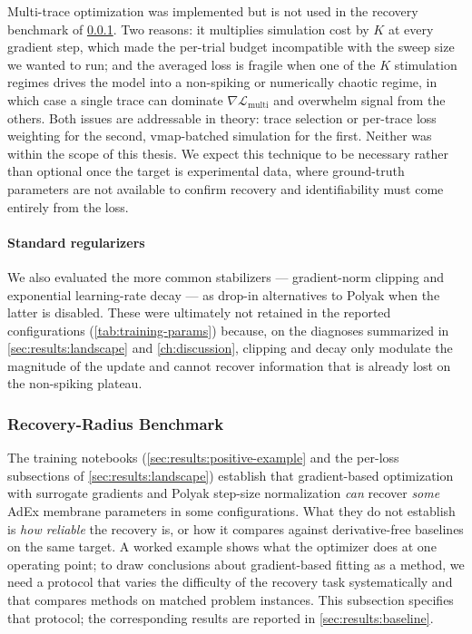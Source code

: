 Multi-trace optimization was implemented but is not used in the recovery benchmark of \cref{sec:method:opt:recovery-benchmark}.
Two reasons: it multiplies simulation cost by $K$ at every gradient step, which made the per-trial budget incompatible with the sweep size we wanted to run;
and the averaged loss is fragile when one of the $K$ stimulation regimes drives the model into a non-spiking or numerically chaotic regime,
in which case a single trace can dominate $\nabla\mathcal{L}_{\mathrm{multi}}$ and overwhelm signal from the others.
Both issues are addressable in theory: trace selection or per-trace loss weighting for the second, vmap-batched simulation for the first.
Neither was within the scope of this thesis.
We expect this technique to be necessary rather than optional once the target is experimental data,
where ground-truth parameters are not available to confirm recovery and identifiability must come entirely from the loss.

\paragraph{Standard regularizers}\label{sec:method:opt:stabilization:misc}
We also evaluated the more common stabilizers --- gradient-norm clipping and exponential learning-rate decay ---
as drop-in alternatives to Polyak when the latter is disabled.
These were ultimately not retained in the reported configurations (\cref{tab:training-params})
because, on the diagnoses summarized in \cref{sec:results:landscape} and \cref{ch:discussion},
clipping and decay only modulate the magnitude of the update and cannot recover information that is already lost on the non-spiking plateau.

\subsubsection{Recovery-Radius Benchmark}\label{sec:method:opt:recovery-benchmark}
The training notebooks (\cref{sec:results:positive-example} and the per-loss subsections of \cref{sec:results:landscape}) establish that
gradient-based optimization with surrogate gradients and Polyak step-size normalization \emph{can} recover \emph{some} \gls{AdEx} membrane parameters in some configurations.
What they do not establish is \emph{how reliable} the recovery is, or how it compares against derivative-free baselines on the same target.
A worked example shows what the optimizer does at one operating point;
to draw conclusions about gradient-based fitting as a method, we need a protocol that varies the difficulty of the recovery task systematically
and that compares methods on matched problem instances.
This subsection specifies that protocol; the corresponding results are reported in \cref{sec:results:baseline}.

